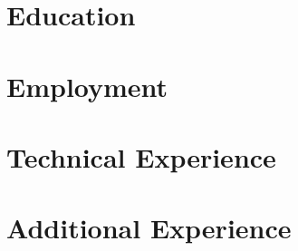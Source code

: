 \documentclass{moderncv}
\begin{document}
\makecvtitle{}
\section{Education}
\section{Employment}
\section{Technical Experience}
\section{Additional Experience}
\end{document}
